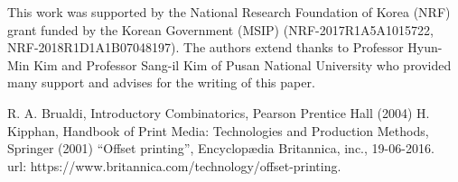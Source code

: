 \begin{acknowledgements}
This work was supported by the National Research Foundation of Korea (NRF)
grant funded by the Korean Government (MSIP) (NRF-2017R1A5A1015722, NRF-2018R1D1A1B07048197). 
The authors extend thanks to Professor Hyun-Min Kim and Professor Sang-il Kim of Pusan National University who provided many support and advises for the writing of this paper.
\end{acknowledgements}


\begin{thebibliography}{}
%
%
R. A. Brualdi, Introductory Combinatorics, Pearson Prentice Hall (2004)
H. Kipphan, Handbook of Print Media: Technologies and Production Methods, Springer (2001)
``Offset printing'', Encyclop{\ae}dia Britannica, inc., 19-06-2016.\\ url: https://www.britannica.com/technology/offset-printing.

\end{thebibliography}




